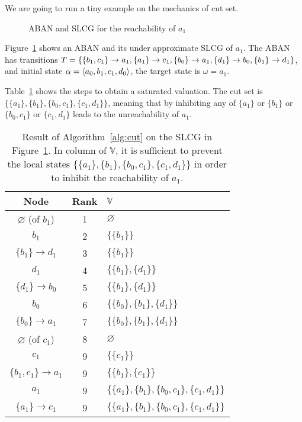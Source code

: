 We are going to run a tiny example on the mechanics of cut set.

\begin{figure}[ht]
\centering

\caption[Example of cut set]{ABAN and SLCG for the reachability of $a_1$}\label{fig:cut}
\end{figure}

\begin{example}\label{example:cutset}
Figure~\ref{fig:cut} shows an ABAN and its under approximate SLCG of $a_1$.
The ABAN has transitions $T=\{\{b_1,c_1\}\rightarrow a_1,\{a_1\}\rightarrow c_1,\{b_0\}\rightarrow a_1,\{d_1\}\rightarrow b_0,\{b_1\}\rightarrow d_1\}$, and initial state $\alpha= \langle a_0,b_1,c_1,d_0\rangle$, the target state is $\omega=a_1$.

Table~\ref{tab:cutset} shows the steps to obtain a saturated valuation.
The cut set is $\{\{a_1\},\{b_1\},\{b_0,c_1\},\{c_1,d_1\}\}$, meaning that by inhibiting any of $\{a_1\}$ or $\{b_1\}$ or $\{b_0,c_1\}$ or $\{c_1,d_1\}$ leads to the unreachability of $a_1$.

\end{example}

\begin{table}[ht]
\centering
\begin{tabular}{|c|c|l|}
 \hline 
 Node & Rank & $\mathbb{V}$ \\ 
 \hline 
 $\varnothing$ (of $b_1$) & 1 & $\varnothing$ \\ 
 \hline 
 $b_1$ & 2 & $\{\{b_1\}\}$ \\ 
 \hline 
 $\{b_1\}\to d_1$ & 3 & $\{\{b_1\}\}$ \\ 
 \hline 
 $d_1$ & 4 & $\{\{b_1\},\{d_1\}\}$ \\ 
 \hline 
 $\{d_1\}\to b_0$ & 5 & $\{\{b_1\},\{d_1\}\}$ \\ 
 \hline 
 $b_0$ & 6 & $\{\{b_0\},\{b_1\},\{d_1\}\}$ \\ 
 \hline 
 $\{b_0\}\to a_1$ & 7 & $\{\{b_0\},\{b_1\},\{d_1\}\}$ \\ 
 \hline 
 $\varnothing$ (of $c_1$) & 8 & $\varnothing$ \\ 
 \hline 
 $c_1$ & 9 & $\{\{c_1\}\}$ \\ 
 \hline 
 $\{b_1,c_1\}\to a_1$ & 9 & $\{\{b_1\},\{c_1\}\}$ \\ 
 \hline 
 $a_1$ & 9 & $\{\{a_1\},\{b_1\},\{b_0,c_1\},\{c_1,d_1\}\}$ \\ 
 \hline 
 $\{a_1\}\to c_1$ & 9 & $\{\{a_1\},\{b_1\},\{b_0,c_1\},\{c_1,d_1\}\}$ \\ 
 \hline 
 \end{tabular}
 \caption[Example of cut set]{Result of Algorithm~\ref{alg:cut} on the SLCG in Figure~\ref{fig:cut}.
 In column of $\mathbb{V}$, it is sufficient to prevent the local states $\{\{a_1\},\{b_1\},\{b_0,c_1\},\{c_1,d_1\}\}$ in order to inhibit the reachability of $a_1$.}\label{tab:cutset}
\end{table}

